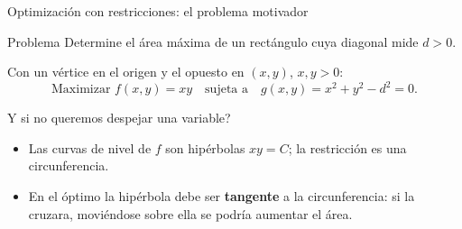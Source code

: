 \documentclass[11pt,aspectratio=169]{beamer}
\begin{document}
\begin{frame}{Optimización con restricciones: el problema motivador}
  \begin{block}{Problema}
    Determine el área máxima de un rectángulo cuya diagonal mide $d>0$.
  \end{block}
  \pause
  Con un vértice en el origen y el opuesto en $(x,y)$, $x,y>0$:
  \[
    \text{Maximizar } f(x,y)=xy
    \quad\text{sujeta a}\quad
    g(x,y)=x^2+y^2-d^2=0.
  \]
  \pause
  \vspace{4pt}
  \begin{center}
  \normalsize\color{tealx} \textquestiondown{}Y si no queremos despejar una variable?
  \end{center}
  \pause
  \vspace{4pt}
  \begin{itemize}
    \item Las curvas de nivel de $f$ son hipérbolas $xy=C$; la restricción es una circunferencia.
    \pause
    \item En el óptimo la hipérbola debe ser \textbf{tangente} a la circunferencia: si la cruzara, moviéndose sobre ella se podría aumentar el área.
  \end{itemize}
\end{frame}
\end{document}
